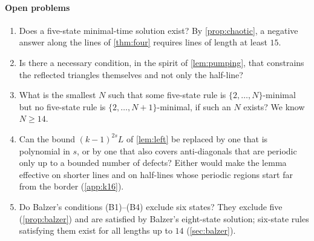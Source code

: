 \paragraph{Open problems}
\begin{enumerate}[label=(\arabic*)]
\item Does a five-state minimal-time solution exist? By
  \cref{prop:chaotic}, a negative answer along the lines of \cref{thm:four}
  requires lines of length at least $15$.
\item Is there a necessary condition, in the spirit of \cref{lem:pumping},
  that constrains the reflected triangles themselves and not only the
  half-line?
\item What is the smallest $N$ such that some five-state rule is
  $\{2,\dots,N\}$-minimal but no five-state rule is
  $\{2,\dots,N+1\}$-minimal, if such an $N$ exists? We know $N\ge14$.
\item Can the bound $(k-1)^{2s}L$ of \cref{lem:left} be replaced by one
  that is polynomial in $s$, or by one that also covers anti-diagonals that
  are periodic only up to a bounded number of defects? Either would make the
  lemma effective on shorter lines and on half-lines whose periodic regions
  start far from the border (\cref{app:k16}).
\item Do Balzer's conditions (B1)--(B4) exclude six states? They exclude
  five (\cref{prop:balzer}) and are satisfied by Balzer's eight-state
  solution; six-state rules satisfying them exist for all lengths up to
  $14$ (\cref{sec:balzer}).
\end{enumerate}
